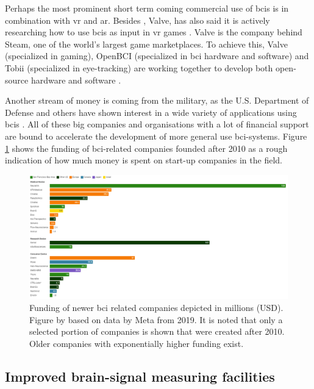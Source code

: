 Perhaps the most prominent short term coming commercial use of \glspl{bci} is in combination with \gls{vr} and \gls{ar}.
Besides \citet{facebook_bci_blog}, Valve, has also said it is actively researching how to use \glspl{bci} as input in \gls{vr} games \citep{valve_bci_interest}.
Valve is the company behind Steam, one of the world's largest game marketplaces.
To achieve this, Valve (specialized in gaming), OpenBCI (specialized in \gls{bci} hardware and software) and Tobii (specialized in eye-tracking) are working together to develop both open-source hardware and software \citep{bci_valve}.

Another stream of money is coming from the military, as the U.S. Department of Defense and others have shown interest in a wide variety of applications using \glspl{bci} \citep{bci_military}.
All of these big companies and organisations with a lot of financial support are bound to accelerate the development of more general use \gls{bci}-systems.
Figure \ref{fig:bci_money} shows the funding of \gls{bci}-related companies founded after 2010 as a rough indication of how much money is spent on start-up companies in the field.

\begin{figure}[ht]
    \centering
    \includegraphics[width=\linewidth]{images/introduction/bci_money.png}
    \captionsetup{width=0.9\linewidth}
    \captionsetup{justification=centering}
    \caption{Funding of newer \gls{bci} related companies depicted in millions (USD).\\Figure by \citet{bci_money} based on data by Meta from 2019. It is noted that only a selected portion of companies is shown that were created after 2010. Older companies with exponentially higher funding exist.}
    \label{fig:bci_money}
\end{figure}


\subsection{Improved brain-signal measuring facilities}
\label{subsec:bci_gaining_popularity_better_measuring}

